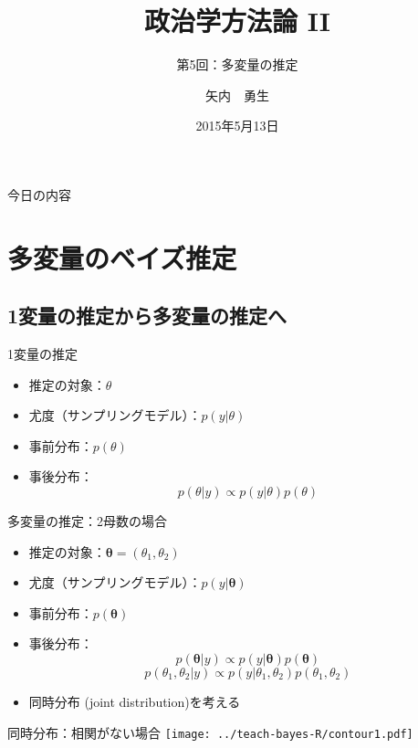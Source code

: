 \documentclass[dvipdfmx,handout]{beamer}
\title{政治学方法論 II}
\subtitle{第5回：多変量の推定}
\author{矢内　勇生}
\institute{法学部・法学研究科}
\date{2015年5月13日}
\begin{document}
 {%
  \frame{\titlepage}
 }

 \begin{frame}{今日の内容}
  \tableofcontents
 \end{frame}

 \section{多変量のベイズ推定}
 
 \subsection{1変量の推定から多変量の推定へ}

 \begin{frame}{1変量の推定}
  \begin{itemize}
   \item 推定の対象：$\theta$
   \item 尤度（サンプリングモデル）：$p(y|\theta)$
   \item 事前分布：$p(\theta)$
   \item 事後分布：\pause
         \[
          p(\theta | y) \propto p(y | \theta) p(\theta)
         \]
  \end{itemize}
 \end{frame}

 \begin{frame}{多変量の推定：2母数の場合}
  \begin{itemize}
   \item 推定の対象：$\bm{\theta} = (\theta_1, \theta_2)$
   \item 尤度（サンプリングモデル）：$p(y|\bm{\theta})$
   \item 事前分布：$p(\bm{\theta})$
   \item 事後分布：\pause
         \[
          p(\bm{\theta} | y) \propto p(y | \bm{\theta}) p(\bm{\theta})
         \]
         \pause          
         \[
          p(\theta_1, \theta_2 | y) \propto p(y | \theta_1, \theta_2) p(\theta_1, \theta_2)
         \]
   \item \alert{同時分布 (joint distribution)}を考える
  \end{itemize}
 \end{frame}

 \begin{frame}{同時分布：相関がない場合}
   \centering
  \texttt{[image: ../teach-bayes-R/contour1.pdf]}
 \end{frame}
\end{document}
